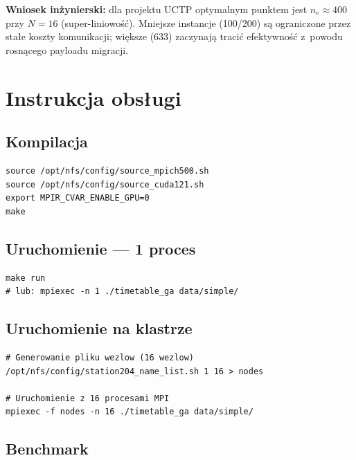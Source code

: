 \documentclass{common/sprawozdanie-agh}
\begin{document}
\textbf{Wniosek inżynierski:} dla projektu UCTP optymalnym punktem jest $n_e \approx 400$ przy $N=16$ (super-liniowość). Mniejsze instancje (100/200) są ograniczone przez stałe koszty komunikacji; większe (633) zaczynają tracić efektywność z~powodu rosnącego payloadu migracji.

\section{Instrukcja obsługi}

\subsection{Kompilacja}

\begin{lstlisting}[style=bashstyle]
source /opt/nfs/config/source_mpich500.sh
source /opt/nfs/config/source_cuda121.sh
export MPIR_CVAR_ENABLE_GPU=0
make
\end{lstlisting}

\subsection{Uruchomienie --- 1 proces}

\begin{lstlisting}[style=bashstyle]
make run
# lub: mpiexec -n 1 ./timetable_ga data/simple/
\end{lstlisting}

\subsection{Uruchomienie na klastrze}

\begin{lstlisting}[style=bashstyle]
# Generowanie pliku wezlow (16 wezlow)
/opt/nfs/config/station204_name_list.sh 1 16 > nodes

# Uruchomienie z 16 procesami MPI
mpiexec -f nodes -n 16 ./timetable_ga data/simple/
\end{lstlisting}

\subsection{Benchmark}
\end{document}
